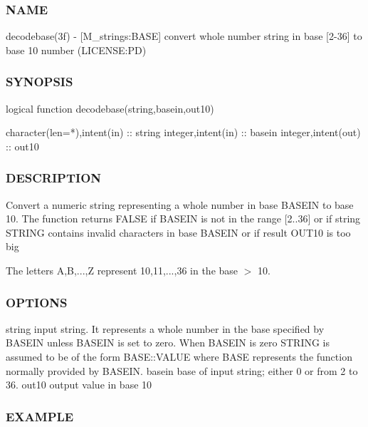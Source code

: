 \subsubsection*{N\+A\+ME}

decodebase(3f) -\/ \mbox{[}M\+\_\+strings\+:B\+A\+SE\mbox{]} convert whole number string in base \mbox{[}2-\/36\mbox{]} to base 10 number (L\+I\+C\+E\+N\+SE\+:PD)

\subsubsection*{S\+Y\+N\+O\+P\+S\+IS}

\begin{DoxyVerb}logical function decodebase(string,basein,out10)

 character(len=*),intent(in)  :: string
 integer,intent(in)           :: basein
 integer,intent(out)          :: out10
\end{DoxyVerb}
 \subsubsection*{D\+E\+S\+C\+R\+I\+P\+T\+I\+ON}

Convert a numeric string representing a whole number in base B\+A\+S\+E\+IN to base 10. The function returns F\+A\+L\+SE if B\+A\+S\+E\+IN is not in the range \mbox{[}2..36\mbox{]} or if string S\+T\+R\+I\+NG contains invalid characters in base B\+A\+S\+E\+IN or if result O\+U\+T10 is too big

The letters A,B,...,Z represent 10,11,...,36 in the base $>$ 10.

\subsubsection*{O\+P\+T\+I\+O\+NS}

string input string. It represents a whole number in the base specified by B\+A\+S\+E\+IN unless B\+A\+S\+E\+IN is set to zero. When B\+A\+S\+E\+IN is zero S\+T\+R\+I\+NG is assumed to be of the form B\+A\+S\+E\+::\+V\+A\+L\+UE where B\+A\+SE represents the function normally provided by B\+A\+S\+E\+IN. basein base of input string; either 0 or from 2 to 36. out10 output value in base 10

\subsubsection*{E\+X\+A\+M\+P\+LE}

